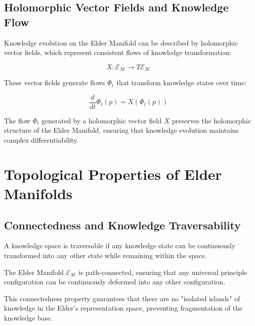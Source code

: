 \subsection{Holomorphic Vector Fields and Knowledge Flow}

Knowledge evolution on the Elder Manifold can be described by holomorphic vector fields, which represent consistent flows of knowledge transformation:

\begin{equation}
X: \mathcal{E}_{\mathcal{M}} \rightarrow T\mathcal{E}_{\mathcal{M}}
\end{equation}

These vector fields generate flows $\Phi_t$ that transform knowledge states over time:

\begin{equation}
\frac{d}{dt}\Phi_t(p) = X(\Phi_t(p))
\end{equation}

\begin{proposition}
The flow $\Phi_t$ generated by a holomorphic vector field $X$ preserves the holomorphic structure of the Elder Manifold, ensuring that knowledge evolution maintains complex differentiability.
\end{proposition}

\section{Topological Properties of Elder Manifolds}

\subsection{Connectedness and Knowledge Traversability}

\begin{definition}
A knowledge space is traversable if any knowledge state can be continuously transformed into any other state while remaining within the space.
\end{definition}

\begin{theorem}
The Elder Manifold $\mathcal{E}_{\mathcal{M}}$ is path-connected, ensuring that any universal principle configuration can be continuously deformed into any other configuration.
\end{theorem}

This connectedness property guarantees that there are no "isolated islands" of knowledge in the Elder's representation space, preventing fragmentation of the knowledge base.

